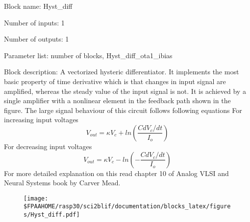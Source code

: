 \pagebreak

Block name: Hyst\_diff

Number of inputs: 1

Number of outputs: 1

Parameter list: number of blocks, Hyst\_diff\_ota1\_ibias

Block description: 
A vectorized hysteric differentiator. It implements the most basic property of time derivative which is that changes in input signal are amplified, whereas the steady value of the input signal is not. 
It is achieved by a single amplifier with a nonlinear element in the feedback path shown in the figure. 
The large signal behaviour of this circuit follows following equations
For increasing input voltages
\begin{equation}
V_{out} = \kappa V_c + ln(\frac{C dV_c/dt}{I_o})
\end{equation}
For decreasing input voltages
\begin{equation}
V_{out} = \kappa V_c - ln(-\frac{C dV_c/dt}{I_o})
\end{equation}
For more detailed explanation on this read chapter 10 of Analog VLSI and Neural Systems book by Carver Mead.

\begin{figure}[H]  %
\texttt{[image: \$FPAAHOME/rasp30/sci2blif/documentation/blocks\_latex/figures/Hyst\_diff.pdf]}
\end{figure}

